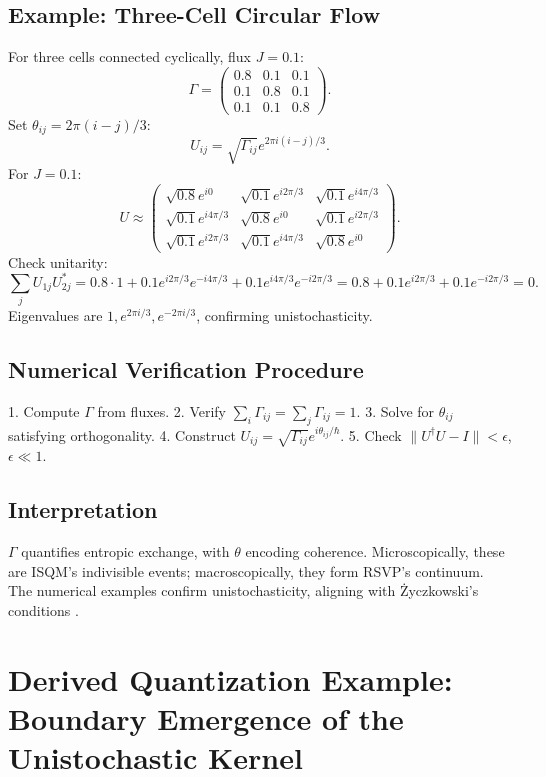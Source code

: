 \documentclass[12pt]{article}
\begin{document}
\subsection{Example: Three-Cell Circular Flow}

For three cells connected cyclically, flux \(J = 0.1\):
\[
\Gamma = \begin{pmatrix} 0.8 & 0.1 & 0.1 \\ 0.1 & 0.8 & 0.1 \\ 0.1 & 0.1 & 0.8 \end{pmatrix}.
\]
Set \(\theta_{ij} = 2\pi (i - j) / 3\):
\[
U_{ij} = \sqrt{\Gamma_{ij}} e^{2\pi i (i - j) / 3}.
\]
For \(J = 0.1\):
\[
U \approx \begin{pmatrix} \sqrt{0.8} e^{i 0} & \sqrt{0.1} e^{i 2\pi / 3} & \sqrt{0.1} e^{i 4\pi / 3} \\ \sqrt{0.1} e^{i 4\pi / 3} & \sqrt{0.8} e^{i 0} & \sqrt{0.1} e^{i 2\pi / 3} \\ \sqrt{0.1} e^{i 2\pi / 3} & \sqrt{0.1} e^{i 4\pi / 3} & \sqrt{0.8} e^{i 0} \end{pmatrix}.
\]
Check unitarity:
\[
\sum_j U_{1j} U_{2j}^* = 0.8 \cdot 1 + 0.1 e^{i 2\pi / 3} e^{-i 4\pi / 3} + 0.1 e^{i 4\pi / 3} e^{-i 2\pi / 3} = 0.8 + 0.1 e^{i 2\pi / 3} + 0.1 e^{-i 2\pi / 3} = 0.
\]
Eigenvalues are \(1, e^{2\pi i / 3}, e^{-2\pi i / 3}\), confirming unistochasticity.

\subsection{Numerical Verification Procedure}

1. Compute \(\Gamma\) from fluxes.
2. Verify \(\sum_i \Gamma_{ij} = \sum_j \Gamma_{ij} = 1\).
3. Solve for \(\theta_{ij}\) satisfying orthogonality.
4. Construct \(U_{ij} = \sqrt{\Gamma_{ij}} e^{i \theta_{ij} / \hbar}\).
5. Check \(\|U^\dagger U - I\| < \epsilon\), \(\epsilon \ll 1\).

\subsection{Interpretation}

\(\Gamma\) quantifies entropic exchange, with \(\theta\) encoding coherence. Microscopically, these are ISQM’s indivisible events; macroscopically, they form RSVP’s continuum. The numerical examples confirm unistochasticity, aligning with Życzkowski’s conditions \citep{Zyczkowski1994}.

\section{Derived Quantization Example: Boundary Emergence of the Unistochastic Kernel}
\end{document}

